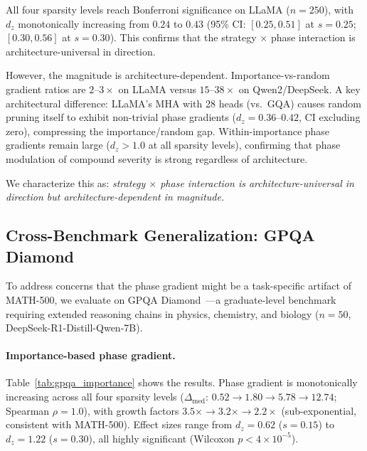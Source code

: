 \documentclass[11pt,a4paper]{article}
\begin{document}
All four sparsity levels reach Bonferroni significance on LLaMA ($n\!=\!250$), with $d_z$ monotonically increasing from $0.24$ to $0.43$ (95\% CI: $[0.25, 0.51]$ at $s\!=\!0.25$; $[0.30, 0.56]$ at $s\!=\!0.30$).
This confirms that the strategy $\times$ phase interaction is architecture-universal in direction.

However, the magnitude is architecture-dependent.
Importance-vs-random gradient ratios are $2$--$3\times$ on LLaMA versus $15$--$38\times$ on Qwen2/DeepSeek.
A key architectural difference: LLaMA's MHA with 28 heads (vs.\ GQA) causes random pruning itself to exhibit non-trivial phase gradients ($d_z = 0.36$--$0.42$, CI excluding zero), compressing the importance/random gap.
Within-importance phase gradients remain large ($d_z > 1.0$ at all sparsity levels), confirming that phase modulation of compound severity is strong regardless of architecture.

We characterize this as: \emph{strategy $\times$ phase interaction is architecture-universal in direction but architecture-dependent in magnitude.}

\subsection{Cross-Benchmark Generalization: GPQA Diamond}
\label{sec:gpqa}

To address concerns that the phase gradient might be a task-specific artifact of MATH-500, we evaluate on GPQA Diamond~\citep{gpqa2024}---a graduate-level benchmark requiring extended reasoning chains in physics, chemistry, and biology ($n\!=\!50$, DeepSeek-R1-Distill-Qwen-7B).

\paragraph{Importance-based phase gradient.}
Table~\ref{tab:gpqa_importance} shows the results.
Phase gradient is monotonically increasing across all four sparsity levels ($\Delta_{\mathrm{med}}$: $0.52 \to 1.80 \to 5.78 \to 12.74$; Spearman $\rho = 1.0$), with growth factors $3.5\times \to 3.2\times \to 2.2\times$ (sub-exponential, consistent with MATH-500).
Effect sizes range from $d_z = 0.62$ ($s\!=\!0.15$) to $d_z = 1.22$ ($s\!=\!0.30$), all highly significant (Wilcoxon $p < 4 \times 10^{-5}$).
\end{document}
